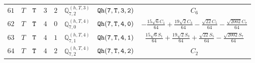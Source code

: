 \documentclass[fleqn,8pt]{jsarticle}
\begin{document}
\begin{table}[ht!]
\begin{center}
\begin{tabular}{cccccccc}
$ 61 $ & $ T $ & $ {\tt T} $ & $ 3 $ & $ 2 $ & $ \mathbb{Q}_{7,2}^{(h,T,3)} $ & $ {\tt Qh(7,T,3,2)} $ & $ C_{6} $ \\
$ 62 $ & $ T $ & $ {\tt T} $ & $ 4 $ & $ 0 $ & $ \mathbb{Q}_{7,0}^{(h,T,4)} $ & $ {\tt Qh(7,T,4,0)} $ & $ - \frac{15 \sqrt{6} C_{1}}{64} + \frac{19 \sqrt{2} C_{3}}{64} - \frac{\sqrt{22} C_{5}}{64} - \frac{\sqrt{2002} C_{7}}{64} $ \\
$ 63 $ & $ T $ & $ {\tt T} $ & $ 4 $ & $ 1 $ & $ \mathbb{Q}_{7,1}^{(h,T,4)} $ & $ {\tt Qh(7,T,4,1)} $ & $ \frac{15 \sqrt{6} S_{1}}{64} + \frac{19 \sqrt{2} S_{3}}{64} + \frac{\sqrt{22} S_{5}}{64} - \frac{\sqrt{2002} S_{7}}{64} $ \\
$ 64 $ & $ T $ & $ {\tt T} $ & $ 4 $ & $ 2 $ & $ \mathbb{Q}_{7,2}^{(h,T,4)} $ & $ {\tt Qh(7,T,4,2)} $ & $ C_{2} $ \\
 \hline \hline
\end{tabular}
\end{center}
\end{table}
\end{document}
